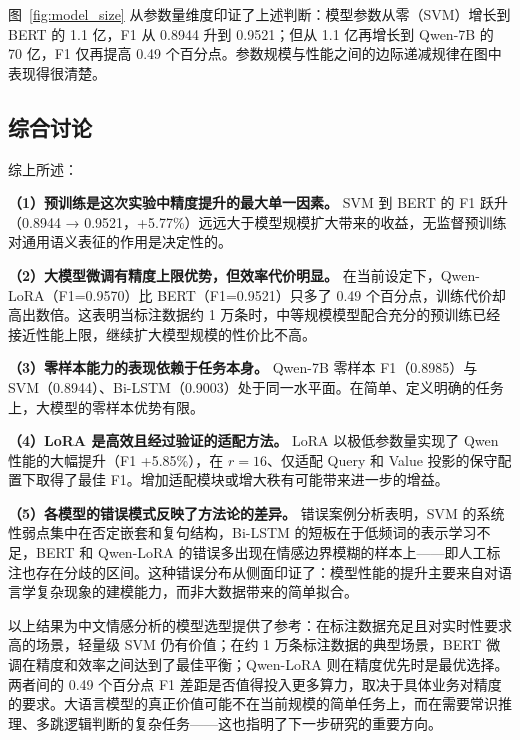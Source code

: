 图~\ref{fig:model_size} 从参数量维度印证了上述判断：模型参数从零（SVM）增长到 BERT 的 1.1 亿，F1 从 0.8944 升到 0.9521；但从 1.1 亿再增长到 Qwen-7B 的 70 亿，F1 仅再提高 0.49 个百分点。参数规模与性能之间的边际递减规律在图中表现得很清楚。

\subsection{综合讨论}
\label{sec:discussion}

综上所述：

\textbf{（1）预训练是这次实验中精度提升的最大单一因素。} SVM 到 BERT 的 F1 跃升（0.8944 → 0.9521，+5.77\%）远远大于模型规模扩大带来的收益，无监督预训练对通用语义表征的作用是决定性的。

\textbf{（2）大模型微调有精度上限优势，但效率代价明显。} 在当前设定下，Qwen-LoRA（F1=0.9570）比 BERT（F1=0.9521）只多了 0.49 个百分点，训练代价却高出数倍。这表明当标注数据约 1 万条时，中等规模模型配合充分的预训练已经接近性能上限，继续扩大模型规模的性价比不高。

\textbf{（3）零样本能力的表现依赖于任务本身。} Qwen-7B 零样本 F1（0.8985）与 SVM（0.8944）、Bi-LSTM（0.9003）处于同一水平面。在简单、定义明确的任务上，大模型的零样本优势有限。

\textbf{（4）LoRA 是高效且经过验证的适配方法。} LoRA 以极低参数量实现了 Qwen 性能的大幅提升（F1 +5.85\%），在 $r=16$、仅适配 Query 和 Value 投影的保守配置下取得了最佳 F1。增加适配模块或增大秩有可能带来进一步的增益。

\textbf{（5）各模型的错误模式反映了方法论的差异。} 错误案例分析表明，SVM 的系统性弱点集中在否定嵌套和复句结构，Bi-LSTM 的短板在于低频词的表示学习不足，BERT 和 Qwen-LoRA 的错误多出现在情感边界模糊的样本上——即人工标注也存在分歧的区间。这种错误分布从侧面印证了：模型性能的提升主要来自对语言学复杂现象的建模能力，而非大数据带来的简单拟合。

以上结果为中文情感分析的模型选型提供了参考：在标注数据充足且对实时性要求高的场景，轻量级 SVM 仍有价值；在约 1 万条标注数据的典型场景，BERT 微调在精度和效率之间达到了最佳平衡；Qwen-LoRA 则在精度优先时是最优选择。两者间的 0.49 个百分点 F1 差距是否值得投入更多算力，取决于具体业务对精度的要求。大语言模型的真正价值可能不在当前规模的简单任务上，而在需要常识推理、多跳逻辑判断的复杂任务——这也指明了下一步研究的重要方向。
